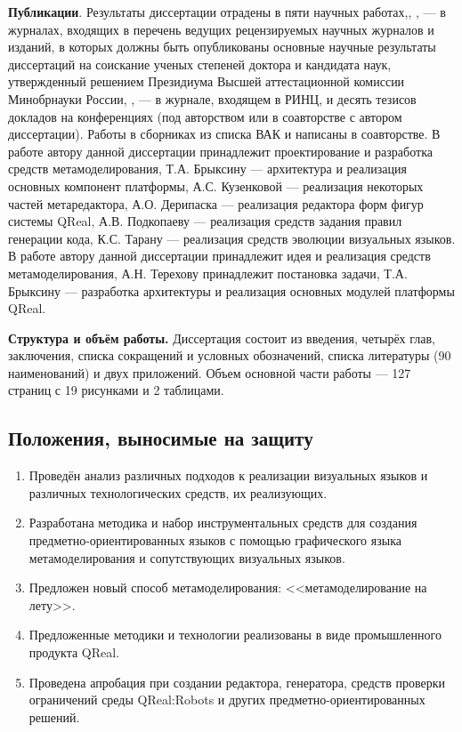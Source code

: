 \textbf{Публикации}. Результаты диссертации отрадены в пяти научных работах,\cite{kuzenkova2011qreal}, 
\cite{litvinov2013robots}, \cite{terekhov2013qreal} --- в журналах, входящих в перечень 
ведущих рецензируемых научных журналов и изданий, в которых должны быть опубликованы 
основные научные результаты диссертаций на соискание ученых степеней доктора и кандидата наук, утвержденный
решением Президиума Высшей аттестационной комиссии Минобрнауки России,
\cite{terekhov2009architecture}, \cite{osechkina2010gestures} --- в журнале, входящем в РИНЦ, и 
десять тезисов докладов на конференциях (под авторством или в соавторстве с автором 
диссертации). Работы в сборниках из списка ВАК \cite{kuzenkova2011qreal} и \cite{terekhov2013qreal}
написаны в соавторстве. В работе \cite{kuzenkova2011qreal} автору данной диссертации 
принадлежит проектирование и разработка средств метамоделирования, Т.А. Брыксину --- архитектура и реализация основных
компонент платформы, А.С. Кузенковой --- реализация некоторых частей метаредактора, А.О. Дерипаска
--- реализация редактора форм фигур системы QReal, А.В. Подкопаеву --- реализация средств задания правил генерации кода,
К.С. Тарану --- реализация средств эволюции визуальных языков. В работе \cite{terekhov2013qreal}
автору данной диссертации принадлежит идея и реализация средств метамоделирования, А.Н. Терехову 
принадлежит постановка задачи, Т.А. Брыксину --- разработка архитектуры и реализация основных модулей платформы QReal.

\textbf{Структура и объём работы.} Диссертация состоит из введения, четырёх глав, заключения, 
списка сокращений и условных обозначений, списка литературы (90 наименований) и двух приложений. Объем основной 
части работы --- 127 страниц с 19 рисунками и 2 таблицами.

\subsection*{\Large Положения, выносимые на защиту}
\begin{enumerate}
	\item Проведён анализ различных подходов к реализации визуальных языков и различных 
		технологических средств, их реализующих.
	\item Разработана методика и набор инструментальных средств для  создания предметно-ориентированных 
		языков с помощью графического языка метамоделирования и сопутствующих визуальных языков.
	\item Предложен новый способ метамоделирования: <<метамоделирование на лету>>.
	\item Предложенные методики и технологии реализованы в виде промышленного продукта QReal.
	\item Проведена апробация при создании редактора, генератора, средств проверки ограничений 
		среды QReal:Robots и других предметно-ориентированных решений.
\end{enumerate}

